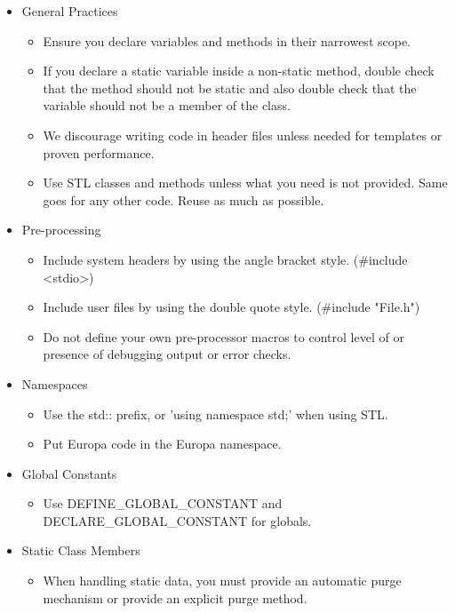 \documentclass[10pt, letterpaper, twoside]{article}
\begin{document}
\begin{itemize}
\item[] General Practices
 \begin{itemize}
  \item	Ensure you declare variables and methods in their narrowest scope.
  \item	If you declare a static variable inside a non-static method, double check that the method should not be static and also double check that the variable should not be a member of the class.
  \item	We discourage writing code in header files unless needed for templates or proven performance.
  \item	Use STL classes and methods unless what you need is not provided.  Same goes for any other code.  Reuse as much as possible. 
 \end{itemize}

\item[] Pre-processing
 \begin{itemize}
  \item	Include system headers by using the angle bracket style. (\#include <stdio>)
  \item	Include user files by using the double quote style. (\#include "File.h")
  \item	Do not define your own pre-processor macros to control level of or presence of debugging output or error checks.
 \end{itemize}

\item[] Namespaces
 \begin{itemize}
  \item	Use the std:: prefix, or 'using namespace std;' when using STL.
  \item	Put Europa code in the Europa namespace.
 \end{itemize}

\item[] Global Constants
 \begin{itemize}
  \item	Use DEFINE\_GLOBAL\_CONSTANT and DECLARE\_GLOBAL\_CONSTANT for globals.
 \end{itemize}

\item[] Static Class Members
 \begin{itemize}
  \item	When handling static data, you must provide an automatic purge mechanism or provide an explicit purge method.
 \end{itemize}


\end{itemize}
\end{document}

